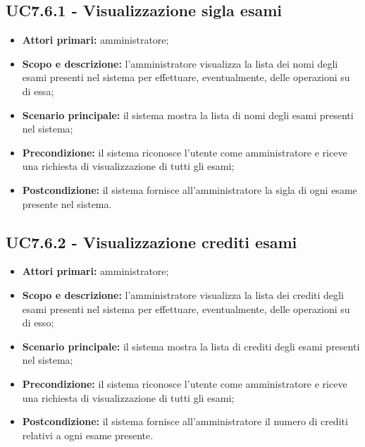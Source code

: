 \documentclass[AnalisiDeiRequisiti.tex]{subfiles}
\begin{document}
\subsection{UC7.6.1 - Visualizzazione sigla esami}
\begin{itemize}
	\item \textbf{Attori primari:} amministratore;
	\item \textbf{Scopo e descrizione:} l'amministratore visualizza la lista dei nomi degli esami presenti nel sistema per effettuare, eventualmente, delle operazioni su di essa;
	\item \textbf{Scenario principale:} il sistema mostra la lista di nomi degli esami presenti nel sistema;
	\item \textbf{Precondizione:} il sistema riconosce l'utente come amministratore e riceve una richiesta di visualizzazione di tutti gli esami; 
	\item \textbf{Postcondizione:} il sistema fornisce all'amministratore la sigla di ogni esame presente nel sistema.
\end{itemize}
\subsection{UC7.6.2 - Visualizzazione crediti esami}
\begin{itemize}
	\item \textbf{Attori primari:} amministratore;
	\item \textbf{Scopo e descrizione:} l'amministratore visualizza la lista dei crediti degli esami presenti nel sistema per effettuare, eventualmente, delle operazioni su di esso;
	\item \textbf{Scenario principale:} il sistema mostra la lista di crediti degli esami presenti nel sistema;
	\item \textbf{Precondizione:} il sistema riconosce l'utente come amministratore e riceve una richiesta di visualizzazione di tutti gli esami; 
	\item \textbf{Postcondizione:} il sistema fornisce all'amministratore il numero di crediti relativi a ogni esame presente.
\end{itemize}
\end{document}
